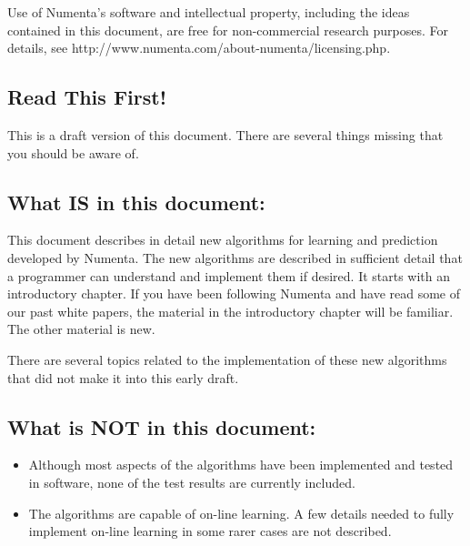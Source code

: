 \documentclass{report}
\begin{document}
\lstset{language=Python}        %



\pagestyle{empty}
\titleHTMCLA

Use of Numenta's software and intellectual property, including the
ideas contained in this document, are free for non-commercial research
purposes. For details, see
http://www.numenta.com/about-numenta/licensing.php.

\clearpage

\subsection*{Read This First!}

This is a draft version of this document. There are several things
missing that you should be aware of.

\subsection*{What IS in this document:}
This document describes in detail new algorithms for learning and
prediction developed by Numenta. The new algorithms are described in
sufficient detail that a programmer can understand and implement them
if desired. It starts with an introductory chapter. If you have been
following Numenta and have read some of our past white papers, the
material in the introductory chapter will be familiar. The other
material is new.

There are several topics related to the implementation of these new
algorithms that did not make it into this early draft.

\subsection*{What is NOT in this document:}

\begin{itemize}

\item Although most aspects of the algorithms have been implemented
and tested in software, none of the test results are currently
included.

\item The algorithms are capable of on-line learning. A few details
needed to fully implement on-line learning in some rarer cases are not
described.

\end{itemize}
\end{document}
